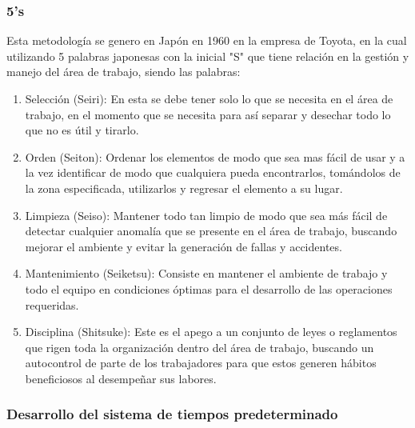      \subsubsection{5's}

     Esta metodología se genero en Japón en 1960 en la empresa de Toyota, en la cual utilizando 5 palabras japonesas con la inicial "S" que tiene relación en la gestión y manejo del área de trabajo, siendo las palabras\cite{5S}:

     \begin{enumerate}
         \item Selección (Seiri): En esta se debe tener solo lo que se necesita en el área de trabajo, en el momento que se necesita para así separar y desechar todo lo que no es útil y tirarlo.
         \item Orden (Seiton): Ordenar los elementos de modo que sea mas fácil de usar y a la vez identificar de modo que cualquiera pueda encontrarlos, tomándolos de la zona especificada, utilizarlos y regresar el elemento a su lugar.
         \item Limpieza (Seiso): Mantener todo tan limpio de modo que sea más fácil de detectar cualquier anomalía que se presente en el área de trabajo, buscando mejorar el ambiente y evitar la generación de fallas y accidentes.
         \item Mantenimiento (Seiketsu): Consiste en mantener el ambiente de trabajo y todo el equipo en condiciones óptimas para el desarrollo de las operaciones requeridas.
         \item Disciplina (Shitsuke): Este es el apego a un conjunto de leyes o reglamentos que rigen toda la organización dentro del área de trabajo, buscando un autocontrol de parte de los trabajadores para que estos generen hábitos beneficiosos al desempeñar sus labores.
     \end{enumerate}

     \subsubsection{Desarrollo del sistema de tiempos predeterminado}


